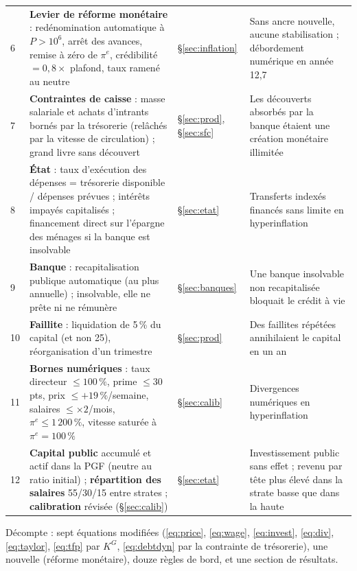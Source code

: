 \documentclass[11pt,a4paper]{article}
\begin{document}
\begin{center}
\begin{longtable}{p{0.5cm}p{6.6cm}p{2.1cm}p{5.8cm}}
6 & \textbf{Levier de réforme monétaire} : redénomination automatique à $P>10^6$, arrêt des avances, remise à zéro de $\pi^e$, crédibilité $=0{,}8\times$ plafond, taux ramené au neutre & \S\ref{sec:inflation} & Sans ancre nouvelle, aucune stabilisation ; débordement numérique en année 12,7\\
7 & \textbf{Contraintes de caisse} : masse salariale et achats d'intrants bornés par la trésorerie (relâchés par la vitesse de circulation) ; grand livre sans découvert & \S\ref{sec:prod}, \S\ref{sec:sfc} & Les découverts absorbés par la banque étaient une création monétaire illimitée\\
8 & \textbf{État} : taux d'exécution des dépenses = trésorerie disponible / dépenses prévues ; intérêts impayés capitalisés ; financement direct sur l'épargne des ménages si la banque est insolvable & \S\ref{sec:etat} & Transferts indexés financés sans limite en hyperinflation\\
9 & \textbf{Banque} : recapitalisation publique automatique (au plus annuelle) ; insolvable, elle ne prête ni ne rémunère & \S\ref{sec:banques} & Une banque insolvable non recapitalisée bloquait le crédit à vie\\
10 & \textbf{Faillite} : liquidation de 5\,\% du capital (et non 25), réorganisation d'un trimestre & \S\ref{sec:prod} & Des faillites répétées annihilaient le capital en un an\\
11 & \textbf{Bornes numériques} : taux directeur $\le100\,\%$, prime $\le30$ pts, prix $\le+19\,\%$/semaine, salaires $\le\times2$/mois, $\pi^e\le1\,200\,\%$, vitesse saturée à $\pi^e=100\,\%$ & \S\ref{sec:calib} & Divergences numériques en hyperinflation\\
12 & \textbf{Capital public} accumulé et actif dans la PGF (neutre au ratio initial) ; \textbf{répartition des salaires} 55/30/15 entre strates ; \textbf{calibration} révisée (\S\ref{sec:calib}) & \S\ref{sec:etat} & Investissement public sans effet ; revenu par tête plus élevé dans la strate basse que dans la haute\\
\bottomrule
\end{longtable}
\end{center}
Décompte : sept équations modifiées (\eqref{eq:price}, \eqref{eq:wage}, \eqref{eq:invest}, \eqref{eq:div}, \eqref{eq:taylor}, \eqref{eq:tfp} par $K^G$, \eqref{eq:debtdyn} par la contrainte de trésorerie), une nouvelle (réforme monétaire), douze règles de bord, et une section de résultats.

\end{document}
